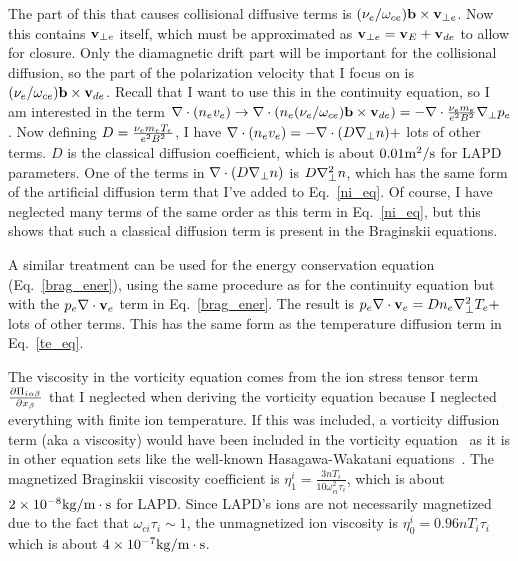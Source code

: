The part of this that causes collisional diffusive terms is $ (\nu_{e}/\omega_{ce}) {\bf b \times v}_{\perp e}$. Now this contains ${\bf v}_{\perp e}$ itself, which must be approximated as 
${\bf v}_{\perp e} = {\bf v}_{E} + {\bf v}_{d e}$ to allow for closure. Only the diamagnetic drift part will be important for the collisional diffusion, so the part of the polarization velocity that I
focus on is $(\nu_{e}/\omega_{ce}) {\bf b \times v}_{d e}$. Recall that I want to use this in the continuity equation, so I am interested in the term 
$\nabla \cdot (n_e v_e) \rightarrow \nabla \cdot \left( n_e (\nu_{e}/\omega_{ce}) {\bf b \times v}_{d e} \right) = - \nabla \cdot \frac{\nu_{e} m_e}{e^2 B^2} \nabla_\perp p_e$. Now defining 
$D = \frac{\nu_{e} m_e T_e}{e^2 B^2}$, I have $\nabla \cdot (n_e v_e) = - \nabla \cdot (D \nabla_\perp n) +$ lots of other terms. $D$ is the classical diffusion coefficient, which is about $0.01 {\rm m^2/s}$
for LAPD parameters. One of the terms in $\nabla \cdot (D \nabla_\perp n)$ is $D \nabla_\perp^2 n$, which has the same form of the artificial diffusion term that I've added to Eq.~\ref{ni_eq}. 
Of course, I have neglected many terms of the same order as this term in Eq.~\ref{ni_eq}, but this shows that such a classical diffusion term is present in the Braginskii equations.

A similar treatment can be used for the energy conservation equation (Eq.~\ref{brag_ener}), using the same procedure as for the continuity equation but with the $p_e \nabla \cdot {\bf v}_e$ term in
Eq.~\ref{brag_ener}. The result is $p_e \nabla \cdot {\bf v}_e = D n_e \nabla_\perp^2 T_e +$ lots of other terms. This has the same form as the temperature diffusion term in Eq.~\ref{te_eq}.

The viscosity in the vorticity equation comes from the ion stress tensor term $\frac{\partial\Pi_{i \alpha \beta}}{\partial x_\beta}$ 
that I neglected when deriving the vorticity equation because I neglected everything with finite
ion temperature. If this was included, a vorticity diffusion term (aka a viscosity) would have been included in the vorticity equation~\cite{popovich2010b}
as it is in other equation sets like the well-known Hasagawa-Wakatani equations~\cite{hasegawa1983}. 
The magnetized Braginskii viscosity coefficient is $\eta_1^i = \frac{3 n T_i}{10 \omega_{ci}^2 \tau_i}$, which is about $2 \times 10^{-8} { \rm kg/m \cdot s}$ 
for LAPD. Since LAPD's ions are not necessarily magnetized due to the fact that $\omega_{ci} \tau_i \sim 1$, the unmagnetized ion viscosity is $\eta_0^i = 0.96 n T_i \tau_i$~\cite{Braginskii1965}
which is about $4 \times 10^{-7} {\rm kg/m \cdot s}$.

